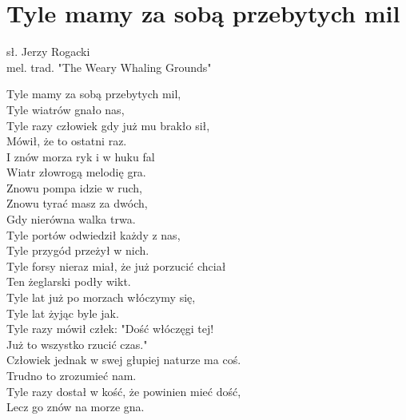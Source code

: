 \section{Tyle mamy za sobą przebytych mil}

sł. Jerzy Rogacki\\
mel. trad. "The Weary Whaling Grounds"

\vspace{2em}
Tyle mamy za sobą przebytych mil, \\
Tyle wiatrów gnało nas, \\
Tyle razy człowiek gdy już mu brakło sił, \\
Mówił, że to ostatni raz. \\

I znów morza ryk i w huku fal \\
Wiatr złowrogą melodię gra. \\
Znowu pompa idzie w ruch, \\
Znowu tyrać masz za dwóch, \\
Gdy nierówna walka trwa. \\

Tyle portów odwiedził każdy z nas, \\
Tyle przygód przeżył w nich. \\
Tyle forsy nieraz miał, że już porzucić chciał \\
Ten żeglarski podły wikt. \\

Tyle lat już po morzach włóczymy się, \\
Tyle lat żyjąc byle jak. \\
Tyle razy mówił człek: "Dość włóczęgi tej! \\
Już to wszystko rzucić czas." \\

Człowiek jednak w swej głupiej naturze ma coś. \\
Trudno to zrozumieć nam. \\
Tyle razy dostał w kość, że powinien mieć dość, \\
Lecz go znów na morze gna.
